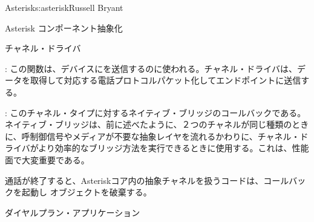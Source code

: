 \begin{aosachapter}{Asterisk}{s:asterisk}{Russell Bryant}
\begin{aosasect1}{Asterisk コンポーネント抽象化}
\begin{aosasect2}{チャネル・ドライバ}
\begin{aosaitemize}
\item {}: この関数は、デバイスにを送信するのに使われる。チャネル・ドライバは、データを取得して対応する電話プロトコルパケット化してエンドポイントに送信する。

\item {}: このチャネル・タイプに対するネイティブ・ブリッジのコールバックである。ネイティブ・ブリッジは、前に述べたように、２つのチャネルが同じ種類のときに、呼制御信号やメディアが不要な抽象レイヤを流れるかわりに、チャネル・ドライバがより効率的なブリッジ方法を実行できるときに使用する。これは、性能面で大変重要である。

\end{aosaitemize}

\noindent
通話が終了すると、Asteriskコア内の抽象チャネルを扱うコードは、コールバックを起動し オブジェクトを破棄する。

\end{aosasect2}

\begin{aosasect2}{ダイヤルプラン・アプリケーション}


\end{aosasect2}
\end{aosasect1}
\end{aosachapter}
